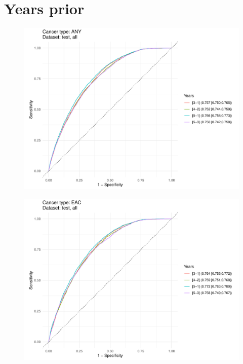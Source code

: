 \documentclass[english]{article}
\begin{document}
\newpage
\clearpage
\section{Years prior}



\begin{figure}[ht]
\includegraphics[width=1.0\linewidth]{years/2y_ANY_all.pdf}
\end{figure}


\begin{figure}[ht]
\includegraphics[width=1.0\linewidth]{years/2y_EAC_all.pdf}
\end{figure}
\end{document}
